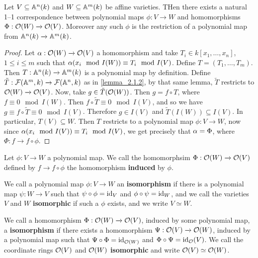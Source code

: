\begin{theorem}\label{theorem_2.1.4}
  Let $V \subseteq \mathbb{A}^n(k)$ and $W \subseteq \mathbb{A}^m(k)$ be affine varieties. THen
  there exists a natural 1--1 correspondence between polynomial maps
  $\phi:V \xrightarrow{} W$ and homomorphisms $\Phi:\mathcal{O}(W) \xrightarrow{} \mathcal{O}(V)$.
  Moreover any such $\phi$ is the restriction of a polynomial map from
  $\mathbb{A}^n(k) \xrightarrow{} \mathbb{A}^m(k)$.
\end{theorem}
\begin{proof}
  Let $\alpha:\mathcal{O}(W) \xrightarrow{} \mathcal{O}(V)$ a homomorphism and take $T_i \in
  k[x_1, \dots, x_n]$, $1 \leq i \leq m$ such that $\alpha(x_i \mod{I(W)}) \equiv
  T_i \mod{I(V)}$. Define $T=(T_1, \dots, T_m)$. Then $T:\mathbb{A}^n(k) \xrightarrow{}
  \mathbb{A}^m(k)$ is a polynomial map by definition. Define $\tilde{T}:\mathcal{F}(\mathbb{A}^m,k)
  \xrightarrow{} \mathcal{F}(\mathbb{A}^n,k)$ as in \ref{lemma_2.1.2}, by that same lemma,
  $\tilde{T}$ restricts to $\mathcal{O}(W) \xrightarrow{} \mathcal{O}(V)$. Now, take $g \in
  \tilde{T}(\mathcal{O}(W))$. Then $g=f \circ T$, where $f \equiv 0 \mod{I(W)}$. Then $f
  \circ \tilde{T} \equiv 0 \mod{I(V)}$, and so we have $g \equiv  f \circ \tilde{T}
  \equiv 0 \mod{I(V)}$. Therefore $g \in I(V)$ and $\tilde{T}(I(W)) \subseteq
  I(V)$. In particular, $T(V) \subseteq W$. Then $T$ restricts to a polynomial
  map  $\phi:V \xrightarrow{} W$, now since $\alpha(x_i \mod{I(V)}) \equiv
  T_i \mod{I(V)}$, we get precisely that $\alpha=\Phi$, where $\Phi:f \xrightarrow{}
  f \circ \phi$.
\end{proof}

\begin{definition}
  Let $\phi:V \xrightarrow{} W$ a polynomial map. We call the homomorphsim
  $\Phi:\mathcal{O}(W) \xrightarrow{} \mathcal{O}(V)$ defined by $f \xrightarrow{} f \circ \phi$
  the homomorphism \textbf{induced} by $\phi$.
\end{definition}

\begin{definition}
  We call a polynomial map $\phi:V \xrightarrow{} W$ an \textbf{isomorphism} if
  there is a polynomial map $\psi:W \xrightarrow{} V$ such that $\psi \circ
  \phi=\operatorname{id}_V$ and  $\phi \circ \psi=\operatorname{id}_W$, and we call the varieties $V$ and
  $W$  \textbf{isomorphic} if such a $\phi$ exists, and we write  $V \simeq W$.
\end{definition}

\begin{definition}
  We call a homomorphism $\Phi:\mathcal{O}(W) \xrightarrow{} \mathcal{O}(V)$, induced by some
  polynomial map, a \textbf{isomorphism} if there exists a homomorphism
  $\Psi:\mathcal{O}(V) \xrightarrow{} \mathcal{O}(W)$, induced by a polynomial map such that
  $\Psi \circ \Phi=\operatorname{id}_{\mathcal{O}(W)}$ and $\Phi \circ \Psi=\operatorname{id}_{\mathcal{O}}(V)$. We call the
  coordinate rings $\mathcal{O}(V)$ and $\mathcal{O}(W)$ \textbf{isomorphic} and write $\mathcal{O}(V)
  \simeq \mathcal{O}(W)$.
\end{definition}


